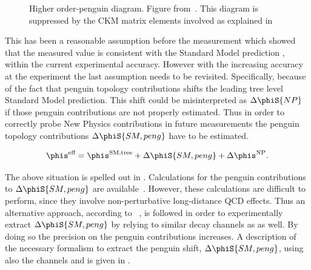 \begin{figure}[!h]
  \centering
  {\sffamily }
  \caption{ Higher order-penguin diagram. Figure from~\cite{jeroenThesis}. This diagram is suppressed by the CKM matrix elements involved as explained in }
  \label{bs2jpsiphi_peng}
\end{figure}

This has been a reasonable assumption before the \lhcb measurement which showed that the measured  value is consistent with the Standard
Model prediction , within the current experimental accuracy. However with the increasing accuracy at the \lhcb experiment the last assumption needs to be revisited.
Specifically, because of the fact that penguin topology contributions shifts the leading tree level Standard Model prediction.
This shift could be misinterpreted as $\Delta\phiS{NP}$ if those penguin contributions are not properly estimated.
Thus in order to correctly probe New Physics contributions in future measurements the penguin topology contributions $\Delta\phiS{SM,peng}$
have to be estimated.

\begin{equation}
\centering
 \phis^{\text {eff}} = \phis^{\tiny \text{SM,tree}} + \Delta\phiS{SM,peng} + \Delta\phis^{\tiny \text{NP}}.
 \label{phis_sm_peng}
\end{equation}

\noindent The above situation is spelled out in .
Calculations for the penguin contributions to $\Delta\phiS{SM,peng}$ are available~\cite{Liu:2013nea,Frings:2015eva}.
However, these calculations are difficult to perform, since they involve non-perturbative long-distance QCD effects. Thus an alternative
approach, according to ~\cite{DeBruyn:2014oga,Frings:2015eva,Faller:2008gt,Liu:2013nea,DeBruyn-thesis}, is followed in order to experimentally extract $\Delta\phiS{SM,peng}$ by relying to
similar decay channels as \BsJpsiPhi as well. By doing so the precision on the penguin contributions increases. A description
of the necessary formalism to extract the penguin shift, $\Delta\phiS{SM,peng}$, using also the channels \BsJpsiKst and \BsJpsiRho is
given in .
